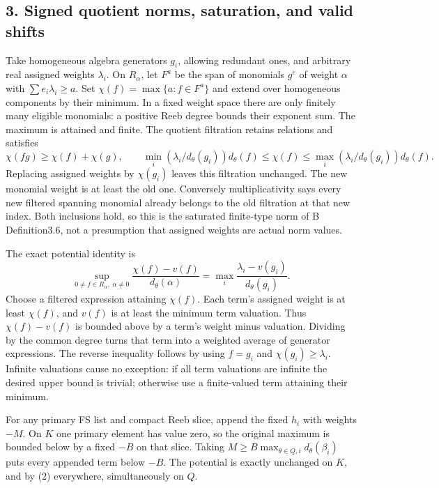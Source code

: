 \documentclass[
  11pt,
]{article}
\begin{document}
\subsection{3. Signed quotient norms, saturation, and valid
shifts}\label{signed-quotient-norms-saturation-and-valid-shifts}

Take homogeneous algebra generators \(g_i\), allowing redundant ones,
and arbitrary real assigned weights \(\lambda_i\). On \(R_\alpha\), let
\(F^a\) be the span of monomials \(g^e\) of weight \(\alpha\) with
\(\sum e_i\lambda_i\geq a\). Set \(\chi(f)=\max\{a:f\in F^a\}\) and
extend over homogeneous components by their minimum. In a fixed weight
space there are only finitely many eligible monomials: a positive Reeb
degree bounds their exponent sum. The maximum is attained and finite.
The quotient filtration retains relations and satisfies
\[ \chi(fg)\geq\chi(f)+\chi(g),\qquad
 \min_i(\lambda_i/d_\theta(g_i))d_\theta(f)\leq\chi(f)
 \leq\max_i(\lambda_i/d_\theta(g_i))d_\theta(f).                          \tag{8}\]
Replacing assigned weights by \(\chi(g_i)\) leaves this filtration
unchanged. The new monomial weight is at least the old one. Conversely
multiplicativity says every new filtered spanning monomial already
belongs to the old filtration at that new index. Both inclusions hold,
so this is the saturated finite-type norm of B Definition3.6, not a
presumption that assigned weights are actual norm values.

The exact potential identity is
\[ \sup_{0\ne f\in R_\alpha,\ \alpha\ne0}
       \frac{\chi(f)-v(f)}{d_\theta(\alpha)}
 =\max_i\frac{\lambda_i-v(g_i)}{d_\theta(g_i)}.                          \tag{9}\]
Choose a filtered expression attaining \(\chi(f)\). Each term's assigned
weight is at least \(\chi(f)\), and \(v(f)\) is at least the minimum
term valuation. Thus \(\chi(f)-v(f)\) is bounded above by a term's
weight minus valuation. Dividing by the common degree turns that term
into a weighted average of generator expressions. The reverse inequality
follows by using \(f=g_i\) and \(\chi(g_i)\geq\lambda_i\). Infinite
valuations cause no exception: if all term valuations are infinite the
desired upper bound is trivial; otherwise use a finite-valued term
attaining their minimum.

For any primary FS list and compact Reeb slice, append the fixed \(h_i\)
with weights \(-M\). On \(K\) one primary element has value zero, so the
original maximum is bounded below by a fixed \(-B\) on that slice.
Taking \(M\geq B\max_{\theta\in Q,i}d_\theta(\beta_i)\) puts every
appended term below \(-B\). The potential is exactly unchanged on \(K\),
and by (2) everywhere, simultaneously on \(Q\).
\end{document}
